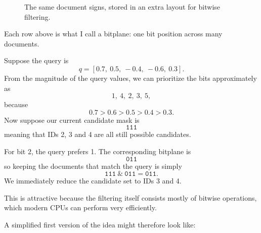 \begin{figure}[H]\centering
{}
\caption{The same document signs, stored in an extra layout for bitwise filtering.}
\end{figure}

Each row above is what I call a bitplane: one bit position across many documents.

Suppose the query is
\[
q=[0.7,\ 0.5,\ -0.4,\ -0.6,\ 0.3].
\]
From the magnitude of the query values, we can prioritize the bits approximately as
\[
1,\ 4,\ 2,\ 3,\ 5,
\]
because
\[
0.7>0.6>0.5>0.4>0.3.
\]
Now suppose our current candidate mask is
\[
\texttt{111}
\]
meaning that IDs 2, 3 and 4 are all still possible candidates.

For bit 2, the query prefers 1. The corresponding bitplane is
\[
\texttt{011}
\]
so keeping the documents that match the query is simply
\[
\texttt{111}\ \&\ \texttt{011}=\texttt{011}.
\]
We immediately reduce the candidate set to IDs 3 and 4.

This is attractive because the filtering itself consists mostly of bitwise operations,
which modern CPUs can perform very efficiently.

A simplified first version of the idea might therefore look like:

